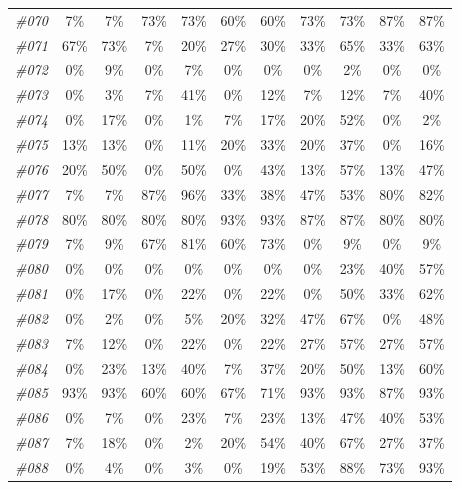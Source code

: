 \begin{table}[t]
\begin{tabular}{ccccccccccc}
    \textit{\#070} & 7\%   & 7\%   & 73\%  & 73\%  & 60\%  & 60\%  & 73\%  & 73\%  & 87\%  & 87\% \\
    \textit{\#071} & 67\%  & 73\%  & 7\%   & 20\%  & 27\%  & 30\%  & 33\%  & 65\%  & 33\%  & 63\% \\
    \textit{\#072} & 0\%   & 9\%   & 0\%   & 7\%   & 0\%   & 0\%   & 0\%   & 2\%   & 0\%   & 0\% \\
    \textit{\#073} & 0\%   & 3\%   & 7\%   & 41\%  & 0\%   & 12\%  & 7\%   & 12\%  & 7\%   & 40\% \\
    \textit{\#074} & 0\%   & 17\%  & 0\%   & 1\%   & 7\%   & 17\%  & 20\%  & 52\%  & 0\%   & 2\% \\
    \textit{\#075} & 13\%  & 13\%  & 0\%   & 11\%  & 20\%  & 33\%  & 20\%  & 37\%  & 0\%   & 16\% \\
    \textit{\#076} & 20\%  & 50\%  & 0\%   & 50\%  & 0\%   & 43\%  & 13\%  & 57\%  & 13\%  & 47\% \\
    \textit{\#077} & 7\%   & 7\%   & 87\%  & 96\%  & 33\%  & 38\%  & 47\%  & 53\%  & 80\%  & 82\% \\
    \textit{\#078} & 80\%  & 80\%  & 80\%  & 80\%  & 93\%  & 93\%  & 87\%  & 87\%  & 80\%  & 80\% \\
    \textit{\#079} & 7\%   & 9\%   & 67\%  & 81\%  & 60\%  & 73\%  & 0\%   & 9\%   & 0\%   & 9\% \\
    \textit{\#080} & 0\%   & 0\%   & 0\%   & 0\%   & 0\%   & 0\%   & 0\%   & 23\%  & 40\%  & 57\% \\
    \textit{\#081} & 0\%   & 17\%  & 0\%   & 22\%  & 0\%   & 22\%  & 0\%   & 50\%  & 33\%  & 62\% \\
    \textit{\#082} & 0\%   & 2\%   & 0\%   & 5\%   & 20\%  & 32\%  & 47\%  & 67\%  & 0\%   & 48\% \\
    \textit{\#083} & 7\%   & 12\%  & 0\%   & 22\%  & 0\%   & 22\%  & 27\%  & 57\%  & 27\%  & 57\% \\
    \textit{\#084} & 0\%   & 23\%  & 13\%  & 40\%  & 7\%   & 37\%  & 20\%  & 50\%  & 13\%  & 60\% \\
    \textit{\#085} & 93\%  & 93\%  & 60\%  & 60\%  & 67\%  & 71\%  & 93\%  & 93\%  & 87\%  & 93\% \\
    \textit{\#086} & 0\%   & 7\%   & 0\%   & 23\%  & 7\%   & 23\%  & 13\%  & 47\%  & 40\%  & 53\% \\
    \textit{\#087} & 7\%   & 18\%  & 0\%   & 2\%   & 20\%  & 54\%  & 40\%  & 67\%  & 27\%  & 37\% \\
    \textit{\#088} & 0\%   & 4\%   & 0\%   & 3\%   & 0\%   & 19\%  & 53\%  & 88\%  & 73\%  & 93\% \\

\end{tabular}
\end{table}
